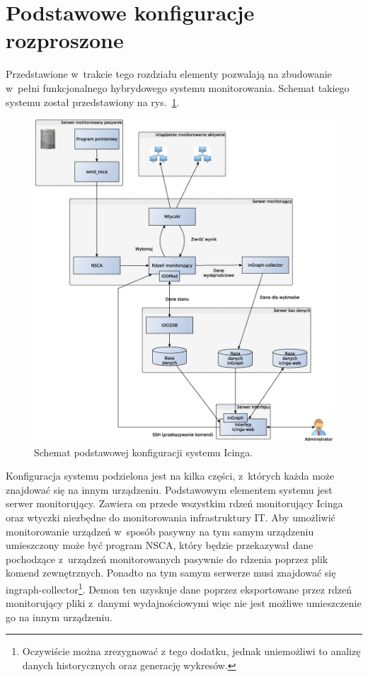 \section[Konfiguracje rozproszone][Podstawowe konfiguracje rozproszone]{Podstawowe konfiguracje rozproszone}

Przedstawione w~trakcie tego rozdziału elementy pozwalają na
zbudowanie w~pełni funkcjonalnego hybrydowego systemu
monitorowania. Schemat takiego systemu został przedstawiony na
rys.~\ref{fig:icingaBase}.

\begin{figure}[htpb]
  \caption{Schemat podstawowej konfiguracji systemu Icinga.}
  \label{fig:icingaBase}
\includegraphics[width=1\textwidth]{img/icingaBase}
\end{figure}

Konfiguracja systemu podzielona jest na kilka części, z~których każda
może znajdować się na innym urządzeniu. Podstawowym elementem systemu
jest serwer monitorujący. Zawiera on przede wszystkim rdzeń
monitorujący Icinga oraz wtyczki niezbędne do monitorowania
infrastruktury IT. Aby umożliwić monitorowanie urządzeń w~sposób
pasywny na tym samym urządzeniu umieszczony może być program NSCA,
który będzie przekazywał dane pochodzące z~urządzeń monitorowanych
pasywnie do rdzenia poprzez plik komend zewnętrznych. Ponadto na tym
samym serwerze musi znajdować się
ingraph-collector\footnote{Oczywiście można zrezygnować z tego
  dodatku, jednak uniemożliwi to analizę danych historycznych oraz
  generację wykresów.}. Demon ten uzyskuje dane poprzez eksportowane
przez rdzeń monitorujący pliki z~danymi wydajnościowymi więc nie jest
możliwe umieszczenie go na innym urządzeniu.


